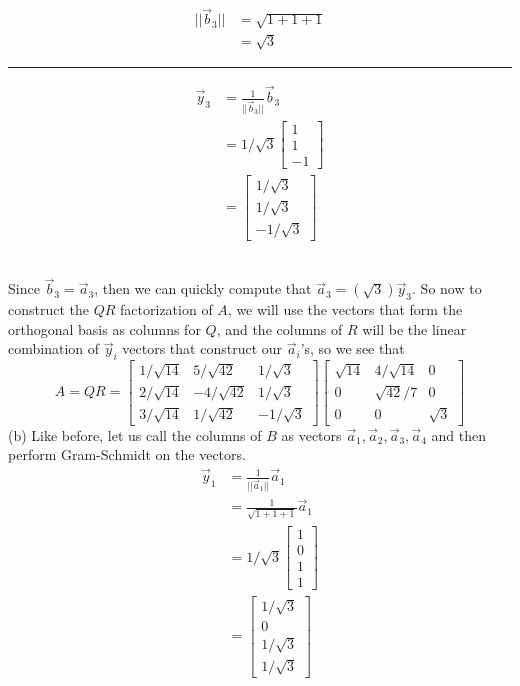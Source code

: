 \documentclass{report}
\begin{document}
\begin{minipage}{0.45\textwidth}
$$
\begin{aligned}
||\vec{b}_3|| &= \sqrt{1+1+1}\\
&=\sqrt{3}
\end{aligned}
$$
\hrule
\vspace{0.5em}
$$
\begin{aligned}
\vec{y}_3 &= \frac{1}{||\vec{b}_3||}\vec{b}_3\\
&=1/\sqrt{3}\begin{bmatrix}1\\1\\-1\end{bmatrix}\\
&=\begin{bmatrix}1/\sqrt{3}\\1/\sqrt{3}\\-1/\sqrt{3}\end{bmatrix}
\end{aligned}
$$
\end{minipage}\\
Since $\vec{b}_3 = \vec{a}_3$,  then we can quickly compute that $\vec{a}_3 = (\sqrt{3})\vec{y}_3$.
\newpage
\noindent So now to construct the $QR$ factorization of $A$,  we will use the vectors that form the orthogonal basis as columns for $Q$,  and the columns of $R$ will be the linear combination of $\vec{y}_i$ vectors that construct our $\vec{a}_i$'s,  so we see that
$$
A = QR = \begin{bmatrix}
1/\sqrt{14}&5/\sqrt{42}&1/\sqrt{3}\\
2/\sqrt{14}&-4/\sqrt{42}&1/\sqrt{3}\\
3/\sqrt{14}&1/\sqrt{42}&-1/\sqrt{3}
\end{bmatrix}
\begin{bmatrix}
\sqrt{14}&4/\sqrt{14}&0\\
0&\sqrt{42}/7&0\\
0&0&\sqrt{3}
\end{bmatrix}
$$
(b) Like before,  let us call the columns of $B$ as vectors $\vec{a}_1, \vec{a}_2,\vec{a}_3,\vec{a}_4$ and then perform Gram-Schmidt on the vectors.
$$
\begin{aligned}
\vec{y}_1 &= \frac{1}{||\vec{a}_1||}\vec{a}_1\\
&=\frac{1}{\sqrt{1+1+1}}\vec{a}_1\\
&=1/\sqrt{3}\begin{bmatrix}1\\0\\1\\1\end{bmatrix}\\
&=\begin{bmatrix}1/\sqrt{3}\\0\\1/\sqrt{3}\\1/\sqrt{3}\end{bmatrix}
\end{aligned}
$$
\end{document}
